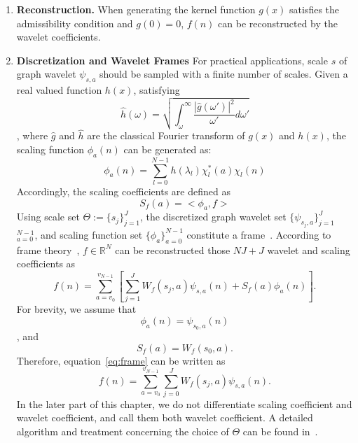  \begin{enumerate}
 \item \textbf{Reconstruction.}
 When generating the kernel function $g(x)$ satisfies the admissibility condition and $g(0)=0$,  $f(n)$ can be reconstructed by the wavelet coefficients.
\item \textbf{Discretization and Wavelet Frames} For practical applications, scale $s$ of graph wavelet $\psi_{s,a}$ should be sampled with a finite number of scales. Given a real valued function $h(x)$, satisfying
\begin{equation}
\hat{h}(\omega) = \sqrt{\int_\omega^\infty\frac{|\hat{g}(\omega')|^2}{\omega'}d{\omega'} }
\end{equation}
, where $\hat{g}$ and $\hat{h}$ are the classical Fourier transform of $g(x)$ and $h(x)$, the scaling function $\phi_{a}(n)$ can be generated as:
\begin{equation}
\label{eq:graphscaledefinition}
\phi_{a}(n) = \sum\limits_{l=0}^{N-1}h(\lambda_l)\chi_l^*(a)\chi_l(n)
\end{equation}
Accordingly, the scaling coefficients are defined as
\begin{equation}
S_f(a)=<\phi_a,f>
\end{equation}
Using scale set $\Theta:=\{s_j\}_{j=1}^J$, the discretized graph wavelet set $\{\psi_{s_j,a}\}_{j=1}^{J}$ $_{a=0}^{N-1}$, and scaling function set $\{\phi_a\}_{a=0}^{N-1}$ constitute a frame~\cite{hammond2011wavelets}.
According to frame theory~\cite{daubechies1992ten}, $f\in \mathbb{R}^N$ can be reconstructed those $NJ+J$ wavelet and scaling coefficients as
\begin{equation}
\label{eq:frame}
f(n)=\sum_{a=v_0}^{v_{N-1}}[\sum_{j=1}^{J}W_{f}(s_j,a)\psi_{s,a}(n)+S_f(a)\phi_{a}(n)].
\end{equation}For brevity, we assume that
\begin{equation}
\phi_a(n)=\psi_{s_0,a}(n)
\end{equation}, and
\begin{equation}
S_f(a)=W_f(s_0,a).
\end{equation}Therefore, equation~\ref{eq:frame} can be written as
\begin{equation}
\label{eq:frame2}
f(n)=\sum_{a=v_0}^{v_{N-1}}\sum_{j=0}^{J}W_{f}(s_j,a)\psi_{s,a}(n).
\end{equation}In the later part of this chapter, we do not differentiate scaling coefficient and wavelet coefficient, and call them both wavelet coefficient. A detailed algorithm and treatment concerning the choice of $\Theta$ can be found in~\cite{hammond2011wavelets}.



\end{enumerate}
